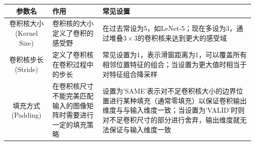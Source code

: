 \begin{longtable}[]{@{}cll@{}}
\toprule
\begin{minipage}[b]{0.16\columnwidth}\centering\strut
参数名\strut
\end{minipage} & \begin{minipage}[b]{0.38\columnwidth}\raggedright\strut
作用\strut
\end{minipage} & \begin{minipage}[b]{0.38\columnwidth}\raggedright\strut
常见设置\strut
\end{minipage}\tabularnewline
\midrule
\endhead
\begin{minipage}[t]{0.16\columnwidth}\centering\strut
卷积核大小 (Kernel Size)\strut
\end{minipage} & \begin{minipage}[t]{0.38\columnwidth}\raggedright\strut
卷积核的大小定义了卷积的感受野\strut
\end{minipage} & \begin{minipage}[t]{0.38\columnwidth}\raggedright\strut
在过去常设为5，如LeNet-5；现在多设为3，通过堆叠\(3\times3\)的卷积核来达到更大的感受域\strut
\end{minipage}\tabularnewline
\begin{minipage}[t]{0.16\columnwidth}\centering\strut
卷积核步长 (Stride)\strut
\end{minipage} & \begin{minipage}[t]{0.38\columnwidth}\raggedright\strut
定义了卷积核在卷积过程中的步长\strut
\end{minipage} & \begin{minipage}[t]{0.38\columnwidth}\raggedright\strut
常见设置为1，表示滑窗距离为1，可以覆盖所有相邻位置特征的组合；当设置为更大值时相当于对特征组合降采样\strut
\end{minipage}\tabularnewline
\begin{minipage}[t]{0.16\columnwidth}\centering\strut
填充方式 (Padding)\strut
\end{minipage} & \begin{minipage}[t]{0.38\columnwidth}\raggedright\strut
在卷积核尺寸不能完美匹配输入的图像矩阵时需要进行一定的填充策略\strut
\end{minipage} & \begin{minipage}[t]{0.38\columnwidth}\raggedright\strut
设置为'SAME'表示对不足卷积核大小的边界位置进行某种填充（通常零填充）以保证卷积输出维度与与输入维度一致；当设置为'VALID'时则对不足卷积尺寸的部分进行舍弃，输出维度就无法保证与输入维度一致\strut
\end{minipage}\tabularnewline

\end{longtable}
